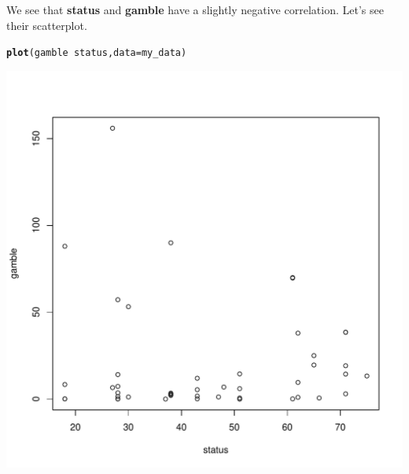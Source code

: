 \documentclass[11pt, a4paper]{article}\usepackage[]{graphicx}\usepackage[]{xcolor}
\makeatletter
\def\maxwidth{ %
  \ifdim\Gin@nat@width>\linewidth
    \linewidth
  \else
    \Gin@nat@width
  \fi
}
\newcommand{\hlopt}[1]{\textcolor[rgb]{0,0,0}{#1}}%
\newcommand{\hlstd}[1]{\textcolor[rgb]{0.345,0.345,0.345}{#1}}%
\newcommand{\hlkwc}[1]{\textcolor[rgb]{0.333,0.667,0.333}{#1}}%
\newcommand{\hlkwd}[1]{\textcolor[rgb]{0.737,0.353,0.396}{\textbf{#1}}}%
\newenvironment{kframe}{%
 \def\at@end@of@kframe{}%
 \ifinner\ifhmode%
  \def\at@end@of@kframe{\end{minipage}}%
  \begin{minipage}{\columnwidth}%
 \fi\fi%
 \def\FrameCommand##1{\hskip\@totalleftmargin \hskip-\fboxsep
 \colorbox{shadecolor}{##1}\hskip-\fboxsep
     \hskip-\linewidth \hskip-\@totalleftmargin \hskip\columnwidth}%
 \MakeFramed {\advance\hsize-\width
   \@totalleftmargin\z@ \linewidth\hsize
   \@setminipage}}%
 {\par\unskip\endMakeFramed%
 \at@end@of@kframe}
\newenvironment{knitrout}{}{} %
\makeatother
\begin{document}
\newpage

We see that \textbf{status} and \textbf{gamble} have a slightly negative correlation. Let's see their scatterplot.
\begin{knitrout}
\color{fgcolor}\begin{kframe}
\begin{alltt}
\hlkwd{plot}\hlstd{(gamble} \hlopt{~} \hlstd{status,} \hlkwc{data} \hlstd{= my_data)}
\end{alltt}
\end{kframe}
\includegraphics[width=\maxwidth]{figure/unnamed-chunk-15-1} 
\end{knitrout}

\newpage
\end{document}
